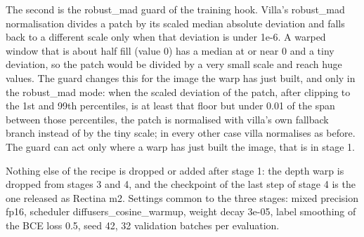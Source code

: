 The second is the robust\_mad guard of the training hook. Villa's robust\_mad normalisation divides a patch by its scaled median absolute deviation and falls back to a different scale only when that deviation is under 1e-6. A warped window that is about half fill (value 0) has a median at or near 0 and a tiny deviation, so the patch would be divided by a very small scale and reach huge values. The guard changes this for the image the warp has just built, and only in the robust\_mad mode: when the scaled deviation of the patch, after clipping to the 1st and 99th percentiles, is at least that floor but under 0.01 of the span between those percentiles, the patch is normalised with villa's own fallback branch instead of by the tiny scale; in every other case villa normalises as before. The guard can act only where a warp has just built the image, that is in stage 1.

Nothing else of the recipe is dropped or added after stage 1: the depth warp is dropped from stages 3 and 4, and the checkpoint of the last step of stage 4 is the one released as Rectina m2. Settings common to the three stages: mixed precision fp16, scheduler diffusers\_cosine\_warmup, weight decay 3e-05, label smoothing of the BCE loss 0.5, seed 42, 32 validation batches per evaluation.
